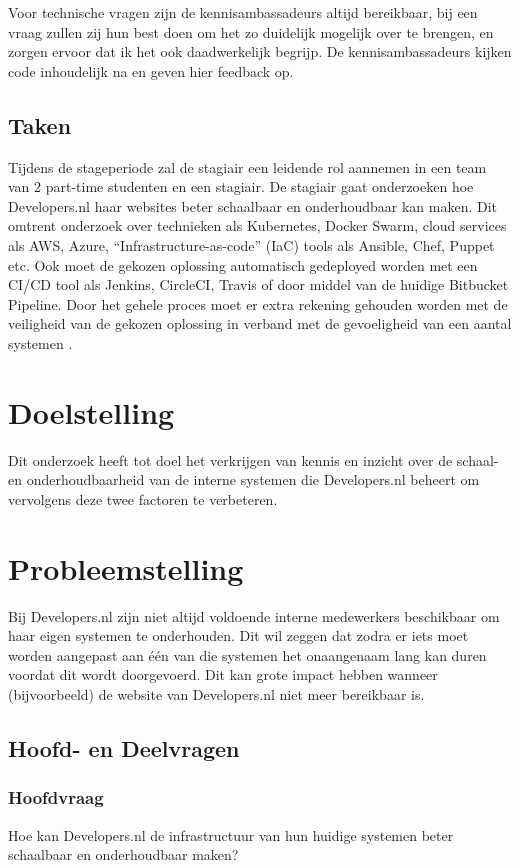 Voor technische vragen zijn de kennisambassadeurs altijd bereikbaar, bij een vraag zullen zij hun best doen om het zo duidelijk mogelijk over te brengen, en zorgen ervoor dat ik het ook daadwerkelijk begrijp. De kennisambassadeurs kijken code inhoudelijk na en geven hier feedback op.

\subsection{Taken}
Tijdens de stageperiode zal de stagiair een leidende rol aannemen in een team van 2 part-time studenten en een stagiair. De stagiair gaat onderzoeken hoe Developers.nl haar websites beter schaalbaar en onderhoudbaar kan maken. Dit omtrent onderzoek over technieken als Kubernetes, Docker Swarm, cloud services als AWS, Azure, \enquote{Infrastructure-as-code} (IaC) tools als Ansible, Chef, Puppet etc. Ook moet de gekozen oplossing automatisch gedeployed worden met een CI/CD tool als Jenkins, CircleCI, Travis of door middel van de huidige Bitbucket Pipeline. Door het gehele proces moet er extra rekening gehouden worden met de veiligheid van de gekozen oplossing in verband met de gevoeligheid van een aantal systemen \parencite{Afstudeervoorstel}.

\section{Doelstelling}

Dit onderzoek heeft tot doel het verkrijgen van kennis en inzicht over de schaal- en onderhoudbaarheid van de interne systemen die Developers.nl beheert om vervolgens deze twee factoren te verbeteren.


\section{Probleemstelling}

Bij Developers.nl zijn niet altijd voldoende interne medewerkers beschikbaar om haar eigen systemen te onderhouden. Dit wil zeggen dat zodra er iets moet worden aangepast aan één van die systemen het onaangenaam lang kan duren voordat dit wordt doorgevoerd. Dit kan grote impact hebben wanneer (bijvoorbeeld) de website van Developers.nl niet meer bereikbaar is.

\subsection{Hoofd- en Deelvragen}
\subsubsection{Hoofdvraag}
Hoe kan Developers.nl de infrastructuur van hun huidige systemen beter schaalbaar en onderhoudbaar maken?

